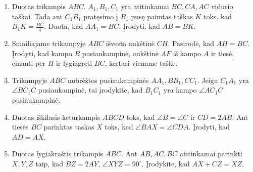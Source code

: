\begin{enumerate}
\item Duotas trikampis $ABC$. $A_1, B_1, C_1$ yra atitinkamai $BC, CA, AC$
  vidurio taškai. Tada ant $C_1 B_1$ pratęsimo į $B_1$ pusę paimtas taškas
  $K$ toks, kad $B_1 K = \frac{BC}{4}$. Duota, kad  $AA_1 = BC$. Įrodyti,
  kad $AB = BK$.
\item Smailiajame trikampyje $ABC$ išvesta aukštinė $CH$.  Pasirodė, kad
  $AH = BC$. Įrodyti, kad kampo $B$ pusiaukampinė, aukštinė $AF$ iš kampo
  $A$ ir tiesė, einanti per $H$ ir lygiagreti $BC$, kertasi viename taške.
\item Trikampyje $ABC$ nubrėžtos pusiaukampinės $AA_1, BB_1, CC_1$. Jeigu
  $C_1A_1$ yra $\angle BC_1C$ pusiaukampinė, tai įrodykite, kad $B_1C_1$
  yra kampo $\angle AC_1C$ pusiaukampinė.
\item Duotas iškilasis keturkampis $ABCD$ toks, kad $\angle B = \angle C$
  ir $CD = 2AB$. Ant tiesės $BC$ parinktas taskas $X$ toks, kad $\angle BAX
  = \angle CDA$. Įrodyti, kad $AD = AX$.
\item Duotas lygiakraštis trikampis $ABC$. Ant $AB, AC, BC$ atitinkamai
  parinkti $X, Y, Z$ taip, kad $BZ = 2AY$, $\angle XYZ = 90^\circ$.
  Įrodykite, kad $AX + CZ = XZ$.

\end{enumerate}
